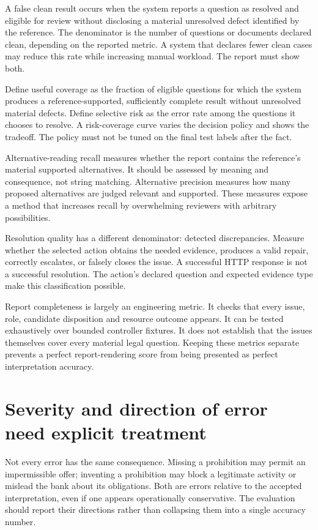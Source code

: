 \documentclass[12pt,a4paper,oneside,openany]{book}
\begin{document}
A false clean result occurs when the system reports a question as resolved and
eligible for review without disclosing a material unresolved defect identified by
the reference. The denominator is the number of questions or documents declared
clean, depending on the reported metric. A system that declares fewer clean cases
may reduce this rate while increasing manual workload. The report must show both.

Define useful coverage as the fraction of eligible questions for which the system
produces a reference-supported, sufficiently complete result without unresolved
material defects. Define selective risk as the error rate among the questions it
chooses to resolve. A risk-coverage curve varies the decision policy and shows the
tradeoff. The policy must not be tuned on the final test labels after the fact.

Alternative-reading recall measures whether the report contains the reference's
material supported alternatives. It should be assessed by meaning and consequence,
not string matching. Alternative precision measures how many proposed alternatives
are judged relevant and supported. These measures expose a method that increases
recall by overwhelming reviewers with arbitrary possibilities.

Resolution quality has a different denominator: detected discrepancies. Measure
whether the selected action obtains the needed evidence, produces a valid repair,
correctly escalates, or falsely closes the issue. A successful HTTP response is
not a successful resolution. The action's declared question and expected evidence
type make this classification possible.

Report completeness is largely an engineering metric. It checks that every issue,
role, candidate disposition and resource outcome appears. It can be tested
exhaustively over bounded controller fixtures. It does not establish that the
issues themselves cover every material legal question. Keeping these metrics
separate prevents a perfect report-rendering score from being presented as
perfect interpretation accuracy.

\section{Severity and direction of error need explicit treatment}
\label{merge:M09:06}


Not every error has the same consequence. Missing a prohibition may permit an
impermissible offer; inventing a prohibition may block a legitimate activity or
mislead the bank about its obligations. Both are errors relative to the accepted
interpretation, even if one appears operationally conservative. The evaluation
should report their directions rather than collapsing them into a single accuracy
number.
\end{document}
